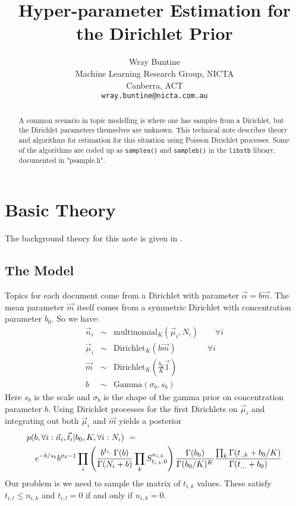 \documentclass{article}
\begin{document}
\author{Wray Buntine\\
   Machine Learning Research Group, NICTA\\
   Canberra, ACT\\
   {\tt wray.buntine@nicta.com.au}
}
\title{Hyper-parameter Estimation for the Dirichlet Prior}
\maketitle

\begin{abstract}
A common scenario in topic modelling is where one has samples from a 
Dirichlet, but the Dirichlet parameters themselves are unknown.
This technical note describes theory and algorithms for estimation 
for this situation using Poisson Dirichlet processes.
Some of the algorithms are coded up as {\tt samplea()} and
{\tt sampleb()} in the {\tt libstb} library, documented
in "psample.h".
\end{abstract}

\section{Basic Theory}

The background theory for this note is given in
\cite{Bun12}.

\subsection{The Model}
Topics for each document come from a Dirichlet with
parameter $\vec\alpha=b \vec{m}$.
The mean parameter $\vec{m}$ itself comes from a symmetric
Dirichlet with concentration parameter $b_0$.
So we have:
\begin{eqnarray*}
\vec{n}_i  &\sim& \mbox{multinomial}_K\left(\vec\mu_i,N_i\right)~~~~~~~~~
\forall i\\
\vec\mu_i &\sim& \mbox{Dirichlet}_K(b\vec{m})~~~~~~~~~~~~~~~~~
\forall i\\
\vec{m}&\sim& \mbox{Dirichlet}_K\left(\frac{b_0}{K}\vec{1}\right)\\
b  &\sim&\mbox{Gamma}(\sigma_b,s_b)
\end{eqnarray*}
Here $s_b$ is the scale and $\sigma_b$ is the shape
of the gamma prior on concentration parameter $b$.
Using Dirichlet processes for the first 
Dirichlets on $\vec\mu_i$ and integrating out
both $\vec\mu_i$ and $\vec{m}$ yields a posterior
\begin{eqnarray}
\label{eq:joint}
\lefteqn{p(b ,\forall i : \vec{n}_i, \vec{t}_i| b_0,K,\forall i : N_i) ~=}&&\\
\nonumber
&& e^{- b/s_b}b^{\sigma_b-1} \prod_i \left( \frac{b^{t_{i,.}}\Gamma(b)}{\Gamma(N_i+b)} 
               \prod_k S^{n_{i,k}}_{t_{i,k},0} \right)
   \frac{\Gamma(b_0)}{\Gamma(b_0/K)^K}
   \frac{\prod_k \Gamma(t_{.,k}+b_0/K)}{\Gamma(t_{.,.}+b_0)}
\end{eqnarray}
Our problem is we need to sample the matrix of $t_{i,k}$ values.
These satisfy
$t_{i,l}\le n_{i,k}$ and
$t_{i,l}=0$ if and only if $n_{i,k}=0$.
\end{document}
